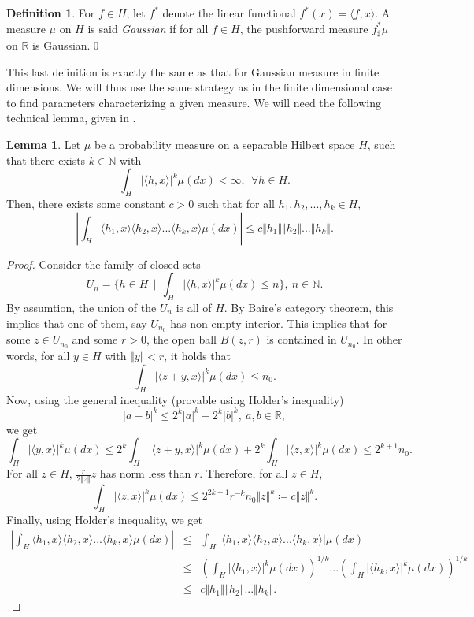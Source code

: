 \documentclass[10pt, a4paper]{report}
\newcommand{\R}[0]{\mathbb{R}}
\theoremstyle{definition}
\newtheorem{lemma}{Lemma}
\newtheorem{definition}{Definition}
\theoremstyle{remark}
\begin{document}
\begin{definition}
	For $f \in H$, let $f^*$ denote the linear functional $f^*(x)=\langle f,x\rangle$. A measure $\mu$ on $H$ is said \emph{Gaussian} if for all $f \in H$, the pushforward  measure $f^*_{\sharp}\mu$ on $\R$ is Gaussian.\qed
\end{definition}
This last definition is exactly the same as that for Gaussian measure in finite dimensions. We will thus use the same strategy as in the finite dimensional case to find parameters characterizing a given measure. We will need the following technical lemma, given in \cite[Lemma 2.15]{prato2}.
\begin{lemma}
	Let $\mu$ be a probability measure on a separable Hilbert space $H$, such that there exists $k\in \mathbb{N}$ with
	$$\int_H \vert \langle h,x\rangle\vert^k \mu(dx) < \infty, \ \ \forall h \in H.$$
	Then, there exists some constant $c>0$ such that for all $h_1,h_2,...,h_k \in H$, 
	$$\left\vert\int_H \langle h_1,x\rangle\langle h_2,x\rangle...\langle h_k,x\rangle   \mu(dx) \right\vert \leq c\Vert h_1\Vert\Vert h_2\Vert...\Vert h_k\Vert.$$
	\begin{proof}
		Consider the family of closed sets 
		$$U_n = \{h\in H \, \mid \, \int_H \vert \langle h,x\rangle\vert^k \mu(dx) \leq n \}, \ n \in \mathbb{N}.$$
		By assumtion, the union of the $U_n$ is all of $H$. By Baire's category theorem, this implies that one of them, say $U_{n_0}$ has non-empty interior. This implies that for some $z \in U_{n_0}$ and some $r > 0$, the open ball $B(z,r)$ is contained in $U_{n_0}$. In other words, for all $y\in H$ with $\Vert y \Vert < r$, it holds that
		$$ \int_H \vert \langle z+y,x\rangle\vert^k \mu(dx) \leq n_0.$$
		Now, using the general inequality (provable using Holder's inequality)
		$$\vert a-b\vert^k \leq 2^k \vert a\vert^k + 2^k \vert b \vert^k, \ a,b \in \R,$$
		we get
		$$\int_H \vert \langle y,x\rangle\vert^k \mu(dx) \leq 2^k\int_H \vert \langle z+y,x\rangle\vert^k \mu(dx) + 2^k\int_H \vert \langle z,x\rangle\vert^k \mu(dx) \leq 2^{k+1}n_0.$$
		For all $z \in H$, $\frac{r}{2\Vert z \Vert}z$ has norm less than $r$. Therefore, for all $z\in H$, 
		$$\int_H \vert \langle z,x\rangle\vert^k \mu(dx) \leq 2^{2k+1}r^{-k}n_0\Vert z \Vert^k \coloneqq c\Vert z \Vert^k.$$
		Finally, using Holder's inequality, we get
		\begin{eqnarray*}
			\left\vert\int_H \langle h_1,x\rangle\langle h_2,x\rangle...\langle h_k,x\rangle   \mu(dx) \right\vert & \leq & \int_H\left\vert \langle h_1,x\rangle\langle h_2,x\rangle...\langle h_k,x\rangle \right\vert  \mu(dx) \\ 
			& \leq & \left(\int_H\left\vert \langle h_1,x\rangle\right\vert^k \mu(dx)\right)^{1/k} ... \left(\int_H\left\vert \langle h_k,x\rangle\right\vert^k \mu(dx)\right)^{1/k} \\
			& \leq & c\Vert h_1\Vert\Vert h_2\Vert...\Vert h_k\Vert.
		\end{eqnarray*}
	\end{proof}
\end{lemma} 
\end{document}
